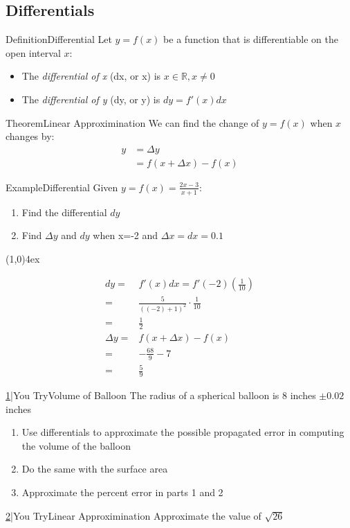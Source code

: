 \documentclass{MathNotes}
\newenvironment{example}[1]{\begin{BlueBox}{Example}{#1}}{\end{BlueBox}}
\newenvironment{definition}[1]{\begin{RedBox}{Definition}{#1}}{\end{RedBox}}
\newenvironment{theorem}[1]{\begin{GrayBox}{Theorem}{#1}}{\end{GrayBox}}
\newenvironment{practice}[2]{\begin{PurpleBox}{\texorpdfstring{#1}\Big|You Try}{#2}}{\end{PurpleBox}}
\newcommand{\br}{
	\begin{center}
		\line(1,0){4ex}
	\end{center}}
\begin{document}
\subsection{Differentials}
\begin{definition}{Differential}
	Let $y=f(x)$ be a function that is differentiable on the open interval $x$:
	\begin{itemize}
		\item The \textit{differential of x} (dx, or \Delta x) is $x\in\mathbb{R}, x\neq 0$
		\item The \textit{differential of y} (dy, or \Delta y) is $dy=f'(x)dx$
	\end{itemize}
\end{definition}
\begin{theorem}{Linear Approximination}
	We can find the change of $y=f(x)$ when $x$ changes by:
	\begin{align*}
		y & =\Delta y           \\
		  & =f(x+\Delta x)-f(x)
	\end{align*}
\end{theorem}
\begin{example}{Differential}
	Given $\displaystyle y=f(x)=\frac{2x-3}{x+1}$:
	\begin{enumerate}
		\item Find the differential $dy$\\\[\]
		\item Find $\Delta y$ and $dy$ when x=-2 and $\Delta x=dx=0.1$
	\end{enumerate}
	\br
	\begin{align*}
		dy =       & f'(x)dx=f'(-2)(\frac{1}{10})                     \\
		=          & \frac{5}{\left((-2)+1\right)^2}\cdot\frac{1}{10} \\
		=          & \frac{1}{2}                                      \\
		\Delta y = & f(x+\Delta x)-f(x)                               \\
        =          & -\frac{68}{9}-7\\
        =          & \frac{5}{9}
	\end{align*}
\end{example}
\begin{practice}{\hyperref[ans:3.6-1]{1}}{Volume of Balloon}
	The radius of a spherical balloon is 8 inches $\pm 0.02$ inches
	\begin{enumerate}
		\item Use differentials to approximate the possible propagated error in computing the volume of the balloon
		\item Do the same with the surface area
		\item Approximate the percent error in parts 1 and 2
	\end{enumerate}
\end{practice}
\begin{practice}{\hyperref[ans:linear-approx]{2}}{Linear Approximination}
    \label{prac:linear-approx}
    Approximate the value of $\displaystyle\sqrt{26}$
\end{practice}
\end{document}
